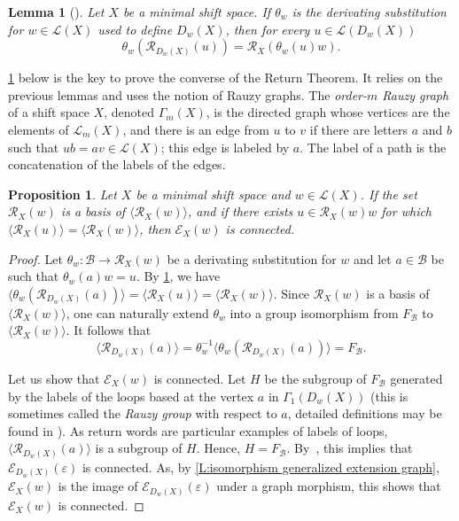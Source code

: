 \documentclass{amsart}
\newcommand*{\ret}{\mathcal{R}}
\newcommand*{\lang}{\mathcal{L}}
\newcommand*{\cB}{\mathcal{B}}
\newcommand*{\from}{\colon}
\newcommand*{\emptyw}{\varepsilon}
\newcommand*{\ExtGraph}{\mathcal{E}}
\newcommand*{\RauzyGraph}{\Gamma}
\newcommand*{\gen}[1]{\langle #1\rangle}
\theoremstyle{plain}
\newtheorem{proposition}[theorem]{Proposition}
\newtheorem{lemma}[theorem]{Lemma}
\theoremstyle{definition}
\theoremstyle{remark}
\begin{document}
\begin{lemma}[{\cite[Proposition 2.6]{Durand1998}}]
\label{l:durand derivation en chaine}
    Let $X$ be a minimal shift space. If $\theta_w$ is the derivating substitution for $w \in \lang(X)$ used to define $D_w(X)$, then for every $u \in \lang(D_w(X))$
    \begin{equation*}
        \theta_w(\ret_{D_w(X)}(u)) = \ret_X(\theta_w(u)w).
    \end{equation*}
\end{lemma}

\cref{P:free implies connected} below is the key to prove the converse of the Return Theorem. It relies on the previous lemmas and uses the notion of Rauzy graphs. The \emph{order-$m$ Rauzy graph} of a shift space $X$, denoted $\RauzyGraph_m(X)$, is the directed graph whose vertices are the elements of $\lang_m(X)$, and there is an edge from $u$ to $v$ if there are letters $a$ and $b$ such that $ub = av \in \lang(X)$; this edge is labeled by $a$. The label of a path is the concatenation of the labels of the edges. 

\begin{proposition}\label{P:free implies connected}
    Let $X$ be a minimal shift space and $w \in \lang(X)$. If the set $\ret_X(w)$ is a basis of $\gen{\ret_X(w)}$, and if there exists $u \in \ret_X(w)w$ for which $\gen{\ret_X(u)} = \gen{\ret_X(w)}$, then $\ExtGraph_X(w)$ is connected.
\end{proposition}

\begin{proof}
    Let $\theta_w\from \cB \to \ret_X(w)$ be a derivating substitution for $w$ and let $a\in\cB$ be such that $\theta_w(a)w = u$. By \cref{l:durand derivation en chaine}, we have $\gen{\theta_w(\ret_{D_w(X)}(a))} = \gen{\ret_X(u)} = \gen{\ret_X(w)}$. Since $\ret_X(w)$ is a basis of $\gen{\ret_X(w)}$, one can naturally extend $\theta_w$ into a group isomorphism from $F_\cB$ to $\gen{\ret_X(w)}$. It follows that
    \begin{equation*}
        \gen{\ret_{D_w(X)}(a)} = \theta_w^{-1}\gen{\theta_w (\ret_{D_w(X)}(a))} = F_\cB.
    \end{equation*}
    
    Let us show that $\ExtGraph_X(w)$ is connected. Let $H$ be the subgroup of $F_\cB$ generated by the labels of the loops based at the vertex $a$ in $\RauzyGraph_1(D_w(X))$ (this is sometimes called the \emph{Rauzy group} with respect to $a$, detailed definitions may be found in \cite[Section 4]{GouletOuellet2022}). As return words are particular examples of labels of loops, $\gen{\ret_{D_w(X)}(a)}$ is a subgroup of $H$. Hence, $H = F_\cB$. By~\cite[Lemma 7.2]{GouletOuellet2022}, this implies that $\ExtGraph_{D_w(X)}(\emptyw)$ is connected. As, by \cref{L:isomorphism generalized extension graph}, $\ExtGraph_X(w)$ is the image of $\ExtGraph_{D_w(X)}(\emptyw)$ under a graph morphism, this shows that $\ExtGraph_X(w)$ is connected.
\end{proof}
\end{document}
